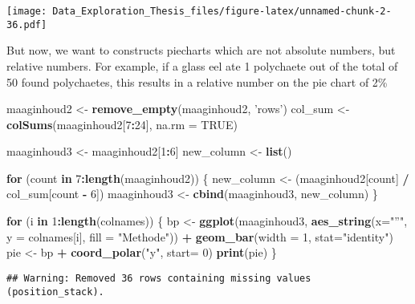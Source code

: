 \documentclass[]{article}
\newenvironment{Shaded}{\begin{snugshade}}{\end{snugshade}}
\newcommand{\KeywordTok}[1]{\textcolor[rgb]{0.13,0.29,0.53}{\textbf{#1}}}
\newcommand{\DataTypeTok}[1]{\textcolor[rgb]{0.13,0.29,0.53}{#1}}
\newcommand{\DecValTok}[1]{\textcolor[rgb]{0.00,0.00,0.81}{#1}}
\newcommand{\StringTok}[1]{\textcolor[rgb]{0.31,0.60,0.02}{#1}}
\newcommand{\OtherTok}[1]{\textcolor[rgb]{0.56,0.35,0.01}{#1}}
\newcommand{\ControlFlowTok}[1]{\textcolor[rgb]{0.13,0.29,0.53}{\textbf{#1}}}
\newcommand{\OperatorTok}[1]{\textcolor[rgb]{0.81,0.36,0.00}{\textbf{#1}}}
\newcommand{\NormalTok}[1]{#1}
\begin{document}
\texttt{[image: Data\_Exploration\_Thesis\_files/figure-latex/unnamed-chunk-2-36.pdf]}

But now, we want to constructs piecharts which are not absolute numbers,
but relative numbers. For example, if a glass eel ate 1 polychaete out
of the total of 50 found polychaetes, this results in a relative number
on the pie chart of 2\%

\begin{Shaded}
\begin{Highlighting}[]
\NormalTok{maaginhoud2 <-}\StringTok{ }\KeywordTok{remove_empty}\NormalTok{(maaginhoud2, }\StringTok{'rows'}\NormalTok{)}
\NormalTok{col_sum <-}\StringTok{ }\KeywordTok{colSums}\NormalTok{(maaginhoud2[}\DecValTok{7}\OperatorTok{:}\DecValTok{24}\NormalTok{], }\DataTypeTok{na.rm =} \OtherTok{TRUE}\NormalTok{)}

\NormalTok{maaginhoud3 <-}\StringTok{ }\NormalTok{maaginhoud2[}\DecValTok{1}\OperatorTok{:}\DecValTok{6}\NormalTok{]}
\NormalTok{new_column <-}\StringTok{ }\KeywordTok{list}\NormalTok{()}

\ControlFlowTok{for}\NormalTok{ (count }\ControlFlowTok{in} \DecValTok{7}\OperatorTok{:}\KeywordTok{length}\NormalTok{(maaginhoud2)) \{}
\NormalTok{  new_column <-}\StringTok{ }\NormalTok{(maaginhoud2[count] }\OperatorTok{/}\StringTok{ }\NormalTok{col_sum[count }\OperatorTok{-}\StringTok{ }\DecValTok{6}\NormalTok{])}
\NormalTok{  maaginhoud3 <-}\StringTok{ }\KeywordTok{cbind}\NormalTok{(maaginhoud3, new_column)}
\NormalTok{\}}

\ControlFlowTok{for}\NormalTok{ (i }\ControlFlowTok{in} \DecValTok{1}\OperatorTok{:}\KeywordTok{length}\NormalTok{(colnames)) \{}
\NormalTok{  bp <-}\StringTok{ }\KeywordTok{ggplot}\NormalTok{(maaginhoud3, }\KeywordTok{aes_string}\NormalTok{(}\DataTypeTok{x=}\StringTok{"''"}\NormalTok{, }\DataTypeTok{y =}\NormalTok{ colnames[i], }\DataTypeTok{fill =} \StringTok{"Methode"}\NormalTok{)) }\OperatorTok{+}
\StringTok{    }\KeywordTok{geom_bar}\NormalTok{(}\DataTypeTok{width =} \DecValTok{1}\NormalTok{, }\DataTypeTok{stat=}\StringTok{"identity"}\NormalTok{)}
\NormalTok{  pie <-}\StringTok{ }\NormalTok{bp }\OperatorTok{+}\StringTok{ }\KeywordTok{coord_polar}\NormalTok{(}\StringTok{"y"}\NormalTok{, }\DataTypeTok{start=} \DecValTok{0}\NormalTok{)}
  \KeywordTok{print}\NormalTok{(pie)}
\NormalTok{\}}
\end{Highlighting}
\end{Shaded}

\begin{verbatim}
## Warning: Removed 36 rows containing missing values (position_stack).
\end{verbatim}
\end{document}
